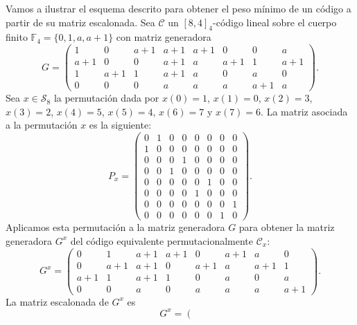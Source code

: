 \begin{exampleth}
    Vamos a ilustrar el esquema descrito para obtener el peso mínimo de un código a partir de su matriz escalonada. Sea $\mathcal{C}$ un $[8, 4]_4$-código lineal sobre el cuerpo finito $\mathbb{F}_4 = \{ 0, 1, a, a + 1 \}$ con matriz generadora
    \[ G =
        \left(
        \begin{array}{cccccccc} 
            1 & 0 & a+1 & a+1 & a+1 & 0 & 0 & a  \\
            a+1 & 0 & 0 & a+1 & a & a+1 & 1 & a+1  \\
            1 & a+1 & 1 & a+1 & a & 0 & a & 0  \\
            0 & 0 & 0 & a & a & a & a+1 & a
        \end{array}
        \right).
    \]
    Sea $x \in \mathcal{S}_8$ la permutación dada por $x(0) = 1$, $x(1) = 0$, $x(2) = 3$, $x(3) = 2$, $x(4) = 5$, $x(5) = 4$, $x(6) = 7$ y $x(7) = 6$. La matriz asociada a la permutación $x$ es la siguiente:
    \[ P_x =
        \left(
        \begin{array}{cccccccc} 
            0 & 1 & 0 & 0 & 0 & 0 & 0 & 0  \\
            1 & 0 & 0 & 0 & 0 & 0 & 0 & 0  \\
            0 & 0 & 0 & 1 & 0 & 0 & 0 & 0  \\
            0 & 0 & 1 & 0 & 0 & 0 & 0 & 0  \\
            0 & 0 & 0 & 0 & 0 & 1 & 0 & 0  \\
            0 & 0 & 0 & 0 & 1 & 0 & 0 & 0  \\
            0 & 0 & 0 & 0 & 0 & 0 & 0 & 1  \\
            0 & 0 & 0 & 0 & 0 & 0 & 1 & 0 
        \end{array}
        \right).
    \]
    Aplicamos esta permutación a la matriz generadora $G$ para obtener la matriz generadora $G^x$ del código equivalente permutacionalmente $\mathcal{C}_x$:
    \[ G^x =
        \left(
        \begin{array}{cccccccc} 
            0 & 1 & a+1 & a+1 & 0 & a+1 & a & 0  \\
            0 & a+1 & a+1 & 0 & a+1 & a & a+1 & 1  \\
            a+1 & 1 & a+1 & 1 & 0 & a & 0 & a  \\
            0 & 0 & a & 0 & a & a & a & a+1
        \end{array}
        \right).
    \]
    La matriz escalonada de $G^x$ es
    \[ G^x =
        \left(
        \begin{array}{cccccccc} 

\end{array}\]
\end{exampleth}
